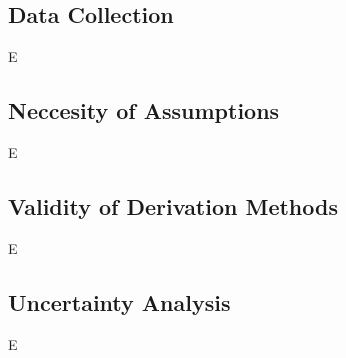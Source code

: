 \subsection{Data Collection}
\label{ssec:B1}

E

\subsection{Neccesity of Assumptions}
\label{ssec:B2}

E

\subsection{Validity of Derivation Methods}
\label{ssec:B3}

E

\subsection{Uncertainty Analysis}
\label{ssec:B4}

E
